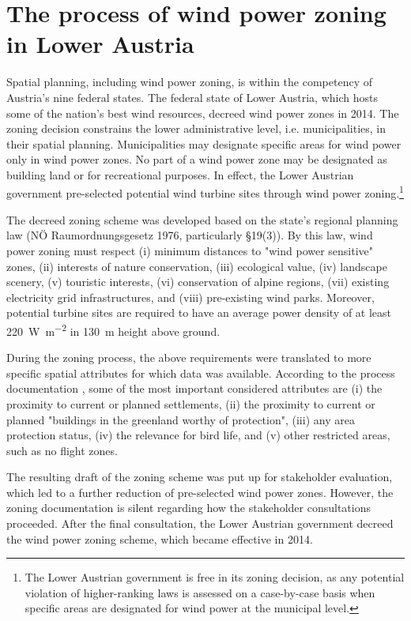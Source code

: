 \documentclass[review, a4paper, 12pt, authoryear, times]{elsarticle}
\begin{document}
\section{The process of wind power zoning in Lower Austria} \label{sec:desclaut}
Spatial planning, including wind power zoning, is within the competency of Austria's nine federal states.
The federal state of Lower Austria, which hosts some of the nation's best wind resources, decreed wind power zones in 2014.
The zoning decision constrains the lower administrative level, i.e. municipalities, in their spatial planning.
Municipalities may designate specific areas for wind power only in wind power zones. No part of a wind power zone may be designated as building land or for recreational purposes.
In effect, the Lower Austrian government pre-selected potential wind turbine sites through wind power zoning.\footnote{The Lower Austrian government is free in its zoning decision, as any potential violation of higher-ranking laws is assessed on a case-by-case basis when specific areas are designated for wind power at the municipal level.}

The decreed zoning scheme was developed based on the state's regional planning law (NÖ Raumordnungsgesetz 1976, particularly §19(3)). 
By this law, wind power zoning must respect (i) minimum distances to "wind power sensitive" zones, (ii) interests of nature conservation, (iii) ecological value, (iv) landscape scenery, (v) touristic interests, (vi) conservation of alpine regions, (vii) existing electricity grid infrastructures, and (viii) pre-existing wind parks. 
Moreover, potential turbine sites are required to have an average power density of at least \SI{220}{\watt\per\metre\squared} in \SI{130}{\metre} height above ground.

During the zoning process, the above requirements were translated to more specific spatial attributes for which data was available. 
According to the process documentation \citep{Knoll2014}, some of the most important considered attributes are (i) the proximity to current or planned settlements, (ii) the proximity to current or planned "buildings in the greenland worthy of protection", (iii) any area protection status, (iv) the relevance for bird life, and (v) other restricted areas, such as no flight zones.

The resulting draft of the zoning scheme was put up for stakeholder evaluation, which led to a further reduction of pre-selected wind power zones.
However, the zoning documentation is silent regarding how the stakeholder consultations proceeded.
After the final consultation, the Lower Austrian government decreed the wind power zoning scheme, which became effective in 2014.
\end{document}
